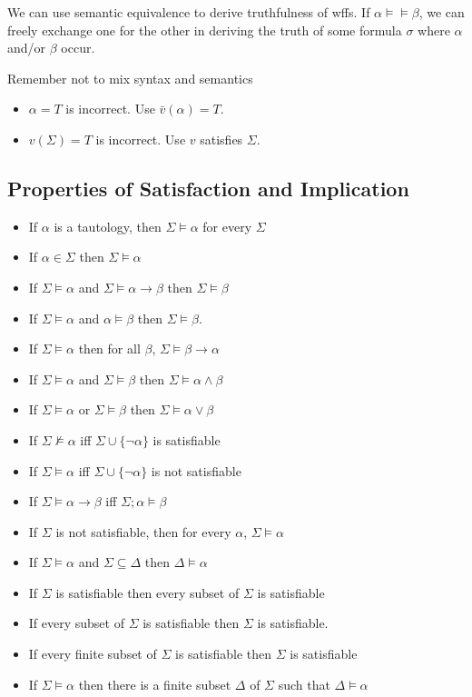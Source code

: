 We can use semantic equivalence to derive truthfulness of wffs. If $\alpha\vDash\models\beta$, we can freely exchange one for the other in deriving the truth of some formula $\sigma$ where $\alpha$ and/or $\beta$ occur.

Remember not to mix syntax and semantics

\begin{itemize}
    \item $\alpha=T$ is incorrect. Use $\bar{v}(\alpha)=T$.
    \item $v(\Sigma)=T$ is incorrect. Use $v$ satisfies $\Sigma$.
\end{itemize}

\subsection{Properties of Satisfaction and Implication}

\begin{itemize}
    \item If $\alpha$ is a tautology, then $\Sigma\vDash\alpha$ for every $\Sigma$
    \item If $\alpha\in\Sigma$ then $\Sigma\vDash\alpha$
    \item If $\Sigma\vDash\alpha$ and $\Sigma\vDash\alpha\to\beta$ then $\Sigma\vDash\beta$
    \item If $\Sigma\vDash\alpha$ and $\alpha\vDash\beta$ then $\Sigma\vDash\beta$.
    \item If $\Sigma\vDash\alpha$ then for all $\beta$, $\Sigma\vDash\beta\to\alpha$
    \item If $\Sigma\vDash\alpha$ and $\Sigma\vDash\beta$ then $\Sigma\vDash \alpha\wedge\beta$
    \item If $\Sigma\vDash\alpha$ or $\Sigma\vDash\beta$ then $\Sigma\vDash \alpha\vee\beta$
    \item If $\Sigma\nvDash\alpha$ iff $\Sigma\cup\{\neg\alpha\}$ is satisfiable
    \item If $\Sigma \vDash \alpha$ iff $\Sigma \cup \{\neg \alpha\}$ is not satisfiable
    \item If $\Sigma \vDash \alpha \to \beta$ iff $\Sigma;\alpha \vDash \beta$
    \item If $\Sigma$ is not satisfiable, then for every $\alpha$, $\Sigma\vDash\alpha$
    \item If $\Sigma\vDash\alpha$ and $\Sigma\subseteq\Delta$ then $\Delta\vDash\alpha$
    \item If $\Sigma$ is satisfiable then every subset of $\Sigma$ is satisfiable
    \item If every subset of $\Sigma$ is satisfiable then $\Sigma$ is satisfiable.
    \item If every finite subset of $\Sigma$ is satisfiable then $\Sigma$ is satisfiable
    \item If $\Sigma\vDash\alpha$ then there is a finite subset $\Delta$ of $\Sigma$ such that $\Delta\vDash\alpha$
\end{itemize}

